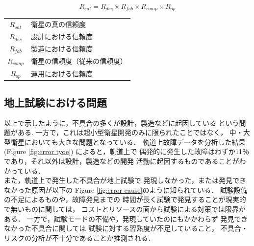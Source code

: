 \documentclass[11pt]{article}
\begin{document}
\begin{equation}
   R_{sat} = R_{des} \times R_{fab} \times R_{comp} \times R_{op} \label{eq:Reliability}
\end{equation}
\begin{table}[H]
   \centering
      \begin{tabular}{cl} 
        $R_{sat}$ & 衛星の真の信頼度\\
        $R_{des}$ & 設計における信頼度\\
        $R_{fab}$ & 製造における信頼度\\
        $R_{comp}$ & 衛星の信頼度（従来の信頼度）\\
        $R_{op}$ & 運用における信頼度
      \end{tabular}
\end{table}

\subsection{地上試験における問題}
以上で示したように，不具合の多くが設計，製造などに起因している
という問題がある.
一方で，これは超小型衛星開発のみに限られたことではなく，
中・大型衛星においても大きな問題となっている．
軌道上故障データを分析した結果\cite{SAITO2011}(Figure \ref{fig:error tyoe})
によると，軌道上で
偶発的に発生した故障はわずか11％であり，それ以外は設計，製造などの開発
活動に起因するものであることがわかっている．\\
また，軌道上で発生した不具合が地上試験で
発現しなかった，または発見できなかった原因が以下の
Figure \ref{fig:error cause}のように知られている．
試験設備の不足によるものや，故障発見までの
時間が長く試験で発見することが現実的で無いものに関しては，
コストとリソースの面から試験による対策では限界がある．
一方で，試験モードの不備や，発現していたのにもかかわらず
発見できなかった不具合に関しては
試験に対する習熟度が不足していること，
不具合・リスクの分析が不十分であることが推測される\cite{SAITO2011}．
\end{document}
